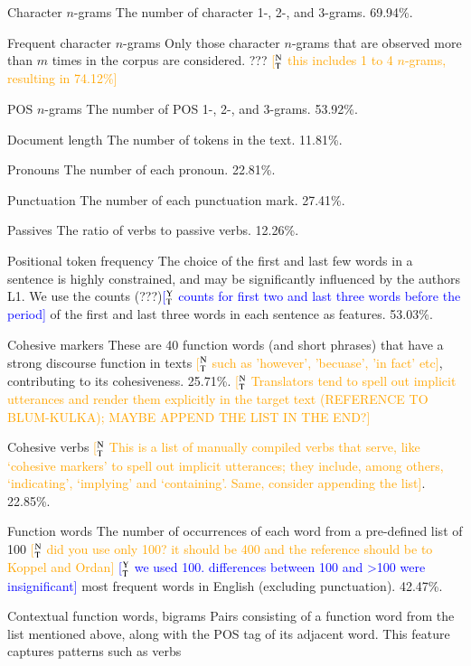 \documentclass[11pt,letterpaper]{article}
\newcommand{\ensuretext}[1]{#1}
\newcommand{\ytmarker}{\ensuretext{\textcolor{blue}{\ensuremath{^{\textsc{Y}}_{\textsc{T}}}}}}
\newcommand{\ntmarker}{\ensuretext{\textcolor{green}{\ensuremath{^{\textsc{N}}_{\textsc{T}}}}}}
\newcommand{\arkcomment}[3]{\ensuretext{\textcolor{#3}{[#1 #2]}}}
\newcommand{\yt}[1]{\arkcomment{\ytmarker}{#1}{blue}}
\newcommand{\nt}[1]{\arkcomment{\ntmarker}{#1}{orange}}
\begin{document}
\begin{compactdesc}
\item[Character $n$-grams] The number of character 1-, 2-, and
  3-grams. 69.94\%.
\item[Frequent character $n$-grams] Only those character $n$-grams
  that are observed more than $m$ times in the corpus are
  considered. ??? \nt{this includes 1 to 4 $n$-grams, resulting in 74.12\%}
\item[POS $n$-grams] The number of POS 1-, 2-, and 3-grams. 53.92\%.
\item[Document length] The number of tokens in the text. 11.81\%.
\item[Pronouns] The number of each pronoun. 22.81\%.
\item[Punctuation] The number of each punctuation mark. 27.41\%.
\item[Passives] The ratio of verbs to passive verbs. 12.26\%.
\item[Positional token frequency] The choice of the first and last few
  words in a sentence is highly constrained, and may be significantly
  influenced by the authors L1. We use the counts (???)\yt{counts for first two and last three words before the period} of the first
  and last three words in each sentence as features. 53.03\%.
\item[Cohesive markers] These are 40 function words (and short phrases)
  that have a strong discourse function in texts \nt{such as 'however', 'becuase', 'in fact' etc}, contributing to its
  cohesiveness. 25.71\%. \nt{Translators tend to spell out implicit utterances and render them explicitly in the target text (REFERENCE TO BLUM-KULKA); MAYBE APPEND THE LIST IN THE END?} 
\item[Cohesive verbs] \nt{This is a list of manually compiled verbs that serve, like `cohesive markers' to spell out implicit utterances; they include, among others, `indicating', `implying' and `containing'. Same, consider appending the list}. 22.85\%.
\item[Function words] The number of occurrences of each word from a
  pre-defined list of 100 \nt{did you use only 100? it should be 400 and the reference should be to Koppel and Ordan} \yt{we used 100. differences between 100 and >100 were insignificant} most frequent words in English (excluding
  punctuation). 42.47\%.
\item[Contextual function words, bigrams] Pairs consisting of a
  function word from the list mentioned above, along with the POS tag
  of its adjacent word. This feature captures patterns such as verbs

\end{compactdesc}
\end{document}
